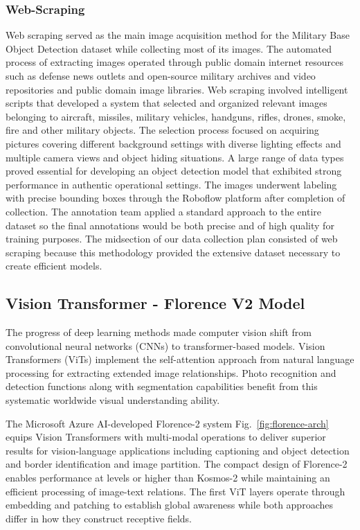 \documentclass[fleqn,10pt,lineno]{wlpeerj}
\begin{document}
\subsubsection{Web-Scraping}
Web scraping served as the main image acquisition method for the Military Base Object Detection dataset while collecting most of its images. The automated process of extracting images operated through public domain internet resources such as defense news outlets and open-source military archives and video repositories and public domain image libraries. Web scraping involved intelligent scripts that developed a system that selected and organized relevant images belonging to aircraft, missiles, military vehicles, handguns, rifles, drones, smoke, fire and other military objects. The selection process focused on acquiring pictures covering different background settings with diverse lighting effects and multiple camera views and object hiding situations. A large range of data types proved essential for developing an object detection model that exhibited strong performance in authentic operational settings. The images underwent labeling with precise bounding boxes through the Roboflow platform after completion of collection. The annotation team applied a standard approach to the entire dataset so the final annotations would be both precise and of high quality for training purposes. The midsection of our data collection plan consisted of web scraping because this methodology provided the extensive dataset necessary to create efficient models.

\subsection{Vision Transformer - Florence V2 Model}

The progress of deep learning methods made computer vision shift from convolutional neural networks (CNNs) to transformer-based models. Vision Transformers (ViTs) implement the self-attention approach from natural language processing for extracting extended image relationships. Photo recognition and detection functions along with segmentation capabilities benefit from this systematic worldwide visual understanding ability.

The Microsoft Azure AI-developed Florence-2 system Fig.~\ref{fig:florence-arch} equips Vision Transformers with multi-modal operations to deliver superior results for vision-language applications including captioning and object detection and border identification and image partition. The compact design of Florence-2 enables performance at levels or higher than Kosmos-2 while maintaining an efficient processing of image-text relations. The first ViT layers operate through embedding and patching to establish global awareness while both approaches differ in how they construct receptive fields.
\end{document}
